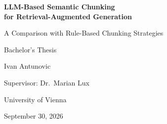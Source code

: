 \documentclass[11pt,a4paper,oneside]{report}
\begin{document}
\begin{titlepage}
  \centering
  \vspace*{3cm}
  {\LARGE\bfseries LLM-Based Semantic Chunking\\for Retrieval-Augmented Generation\par}
  \vspace{0.6cm}
  {\large A Comparison with Rule-Based Chunking Strategies\par}
  \vspace{2.5cm}
  {\large Bachelor's Thesis\par}
  \vspace{0.4cm}
  {\large Ivan Antunovic\par}
  \vspace{2cm}
  {\large Supervisor: Dr.\ Marian Lux\par}
  \vspace{0.4cm}
  {\large University of Vienna\par}
  \vfill
  {\large September 30, 2026\par}
\end{titlepage}
\end{document}
